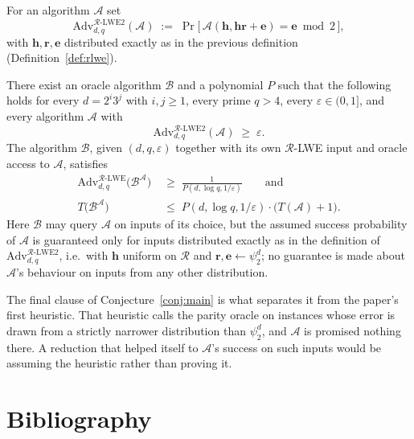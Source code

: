 \documentclass{aicr-conjecture}
\newcommand{\advlwe}{\mathrm{Adv}^{\mathcal{R}\text{-}\mathrm{LWE}}_{d,q}}
\newcommand{\advlwetwo}{\mathrm{Adv}^{\mathcal{R}\text{-}\mathrm{LWE2}}_{d,q}}
\begin{document}
\begin{definition}\label{def:rlwe2}
For an algorithm $\mathcal{A}$ set
\[
  \advlwetwo(\mathcal{A})
  \;:=\;
  \Pr\bigl[\,\mathcal{A}(\mathbf{h}, \mathbf{h}\mathbf{r} + \mathbf{e})
  = \mathbf{e} \bmod 2\,\bigr],
\]
with $\mathbf{h}, \mathbf{r}, \mathbf{e}$ distributed exactly as in the
previous definition (Definition~\ref{def:rlwe}).
\end{definition}

\begin{conjecture}\label{conj:main}
There exist an oracle algorithm $\mathcal{B}$ and a polynomial $P$ such
that the following holds for every $d = 2^{i}3^{j}$ with $i,j \ge 1$,
every prime $q > 4$, every $\varepsilon \in (0,1]$, and every algorithm
$\mathcal{A}$ with
\[
  \advlwetwo(\mathcal{A}) \;\ge\; \varepsilon .
\]
The algorithm $\mathcal{B}$, given $(d, q, \varepsilon)$ together with
its own $\mathcal{R}$-LWE input and oracle access to $\mathcal{A}$,
satisfies
\begin{align*}
  \advlwe\bigl(\mathcal{B}^{\mathcal{A}}\bigr)
  &\;\ge\; \frac{1}{P(d, \log q, 1/\varepsilon)}
  \qquad\text{and} \\
  T\bigl(\mathcal{B}^{\mathcal{A}}\bigr)
  &\;\le\; P(d, \log q, 1/\varepsilon) \cdot
  \bigl(T(\mathcal{A}) + 1\bigr).
\end{align*}
Here $\mathcal{B}$ may query $\mathcal{A}$ on inputs of its choice, but
the assumed success probability of $\mathcal{A}$ is guaranteed only for
inputs distributed exactly as in the definition of
$\advlwetwo$, i.e.\ with $\mathbf{h}$ uniform on $\mathcal{R}$ and
$\mathbf{r}, \mathbf{e} \leftarrow \psi_2^{d}$; no guarantee is made
about $\mathcal{A}$'s behaviour on inputs from any other distribution.
\end{conjecture}

\begin{remark}\label{rem:ondist}
The final clause of Conjecture~\ref{conj:main} is what separates it
from the paper's first heuristic. That heuristic calls the parity
oracle on instances whose error is drawn from a strictly narrower
distribution than $\psi_2^{d}$, and $\mathcal{A}$ is promised nothing
there. A reduction that helped itself to $\mathcal{A}$'s success on
such inputs would be assuming the heuristic rather than proving it.
\end{remark}

\section{Bibliography}
\end{document}
